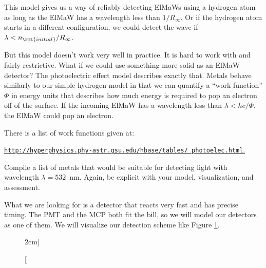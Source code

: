 This model gives us a way of reliably detecting ElMaWs using a hydrogen atom as long as the ElMaW has a wavelength less than $1/R_\infty$. Or if the hydrogen atom starts in a different configuration, we could detect the wave if $\lambda < n_\rmt{initial}/R_\infty$.

But this model doesn't work very well in practice. It is hard to work with and fairly restrictive. What if we could use something more solid as an ElMaW detector? The photoelectric effect model describes exactly that. Metals behave similarly to our simple hydrogen model in that we can quantify a ``work function'' $\Phi$ in energy units that describes how much energy is required to pop an electron off of the surface. If the incoming ElMaW has a wavelength less than $\lambda < h c/\Phi$, the ElMaW could pop an electron.  

\begin{exercise}
There is a list of work functions given at:
\begin{center}
\href{http://hyperphysics.phy-astr.gsu.edu/hbase/tables/photoelec.html}{
\texttt{http://hyperphysics.phy-astr.gsu.edu/hbase/tables/
photoelec.html}.}
\end{center}
Compile a list of metals that would be suitable for detecting light with wavelength $\lambda = 532$~nm. Again, be explicit with your model, visualization, and assessment.
\end{exercise}

What we are looking for is a detector that reacts very fast and has precise timing. The PMT and the MCP both fit the bill, so we will model our detectors as one of them. We will visualize our detection scheme like Figure \ref{fig:detectorschematic}.
\begin{figure}
\centering
{}
\caption[][2cm]{ }
\label{fig:detectorschematic}
\end{figure}

